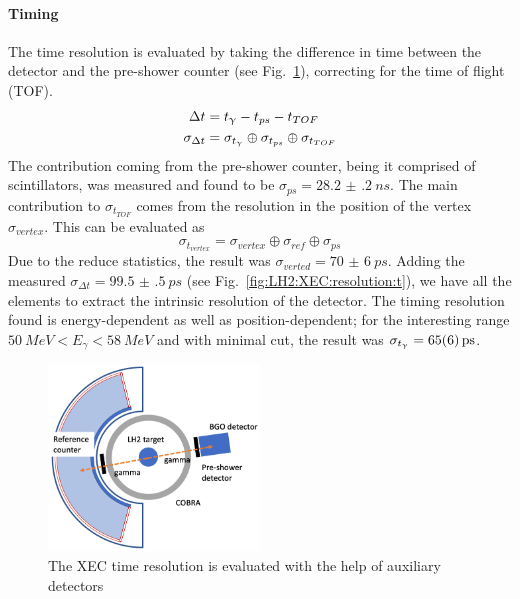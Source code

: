 \begin{refsection}
        \paragraph{Timing}
        The time resolution is evaluated by taking the difference in time between the detector and the pre-shower counter (see Fig.~\ref{fig:CEX:scheme}), correcting for the time of flight (TOF).
        \begin{align}
            \Delta t &= t_\g - t_{ps} - t_{TOF}\\
            \sigma_{\Delta t} &=  \sigma_{t_\g} \oplus \sigma_{t_{ps}} \oplus \sigma_{t_{TOF}}
        \end{align}
        The contribution coming from the pre-shower counter, being it comprised of scintillators, was measured and found to be $\sigma_{ps}=\SI{28.2(2)}{ns}$.
        The main contribution to $\sigma_{t_{TOF}}$ comes from the resolution in the position of the vertex $\sigma_{vertex}$.
        This can be evaluated as 
        $$\sigma_{t_{vertex}} = \sigma_{vertex} \oplus \sigma_{ref} \oplus \sigma_{ps}$$
        Due to the reduce statistics, the result was $\sigma_{verted} = \SI{70(6)}{ps}$.
        Adding the measured $\sigma_{\Delta t} = \SI{99.5(5)}{ps}$ (see Fig.~\ref{fig:LH2:XEC:resolution:t}), we have all the elements to extract the intrinsic resolution of the detector.
        The timing resolution found is energy-dependent as well as position-dependent; for the interesting range $\SI{50}{MeV}<E_\gamma<\SI{58}{MeV}$ and with minimal cut, the result was $\sigma_{t_\g}=\SI{65(6)}{ps}$. 

        \begin{figure}
            \centering
            \includegraphics[width = 0.5\textwidth]{Figures/LH2/2021/CEX_preshower_reference.png}
            \caption[CEX: Sketch with auxiliary detectors]{The XEC time resolution is evaluated with the help of auxiliary detectors}
            \label{fig:CEX:scheme}
        \end{figure}


\end{refsection}
